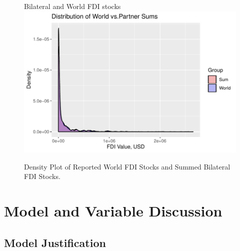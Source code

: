\documentclass[reqno,onecolumn,letterpaper,12pt]{article}
\begin{document}
\begin{figure}[!h]
\centering
Bilateral and World FDI stocks\\
\includegraphics[height=.4\textheight, clip=true, trim=0cm 0cm 0cm .6cm]{SI_figures/descriptive_plots/check_sums.pdf} \vspace{0cm}
\caption{\label{fig:flows} Density Plot of Reported World FDI Stocks and Summed Bilateral FDI Stocks.}
\end{figure}







\section{Model and Variable Discussion}

\subsection*{Model Justification}
\end{document}
